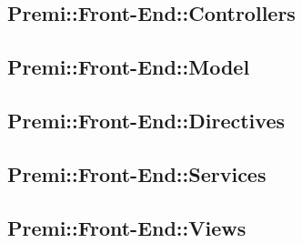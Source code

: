 \subsection{Premi::Front-End::Controllers}

\newpage

\subsection{Premi::Front-End::Model}

\newpage

\subsection{Premi::Front-End::Directives}

\newpage

\subsection{Premi::Front-End::Services}

\newpage

\subsection{Premi::Front-End::Views}

\newpage